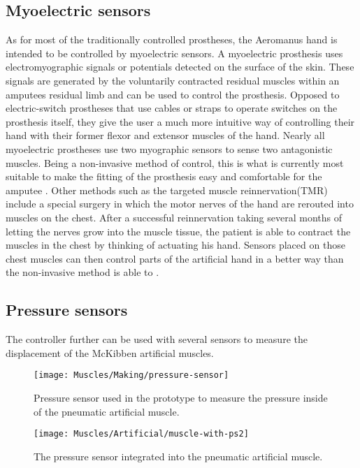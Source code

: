\documentclass[main]{subfiles}
\begin{document}

\subsection{Myoelectric sensors}
As for most of the traditionally controlled prostheses, the Aeromanus hand is intended to be controlled by myoelectric sensors. A myoelectric prosthesis uses electromyographic signals or potentials detected on the surface of the skin. These signals are generated by the voluntarily contracted residual muscles within an amputees residual limb and can be used to control the prosthesis. Opposed to electric-switch prostheses that use cables or straps to operate switches on the prosthesis itself, they give the user a much more intuitive way of controlling their hand with their former flexor and extensor muscles of the hand. Nearly all myoelectric prostheses use two myographic sensors to sense two antagonistic muscles. Being a non-invasive method of control, this is what is currently most suitable to make the fitting of the prosthesis easy and comfortable for the amputee . Other methods such as the targeted muscle reinnervation(TMR) include a special surgery in which the motor nerves of the hand are rerouted into muscles on the chest. After a successful reinnervation taking several months of letting the nerves grow into the muscle tissue, the patient is able to contract the muscles in the chest by thinking of actuating his hand. Sensors placed on those chest muscles can then control parts of the artificial hand in a better way than the non-invasive method is able to \cite{Kuiken2007,targeted-muscle-reinnervation}.

\subsection{Pressure sensors}
The controller further can be used with several sensors to measure the displacement of the McKibben artificial muscles. 

\begin{figure}[htp]
\centering
\texttt{[image: Muscles/Making/pressure-sensor]}
\caption[Pressure sensor]{Pressure sensor used in the prototype to measure the pressure inside of the pneumatic artificial muscle.}
\label{pressure-sensor}
\end{figure}

\begin{figure}[htp]
\centering
\texttt{[image: Muscles/Artificial/muscle-with-ps2]}
\caption[Pneumatic Artificial Muscle with integrated pressure sensor]{The pressure sensor integrated into the pneumatic artificial muscle.}
\label{pressure-sensor}
\end{figure}
\end{document}
